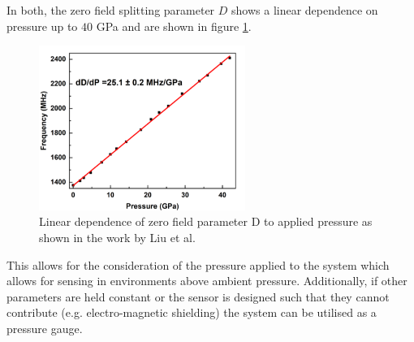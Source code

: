 In both, the zero field splitting parameter $D$ shows
a linear dependence on pressure up to $40$ GPa \cite{doi:10.1021/acs.nanolett.2c03378} and are shown in figure \ref{fig:pressure_d}.

\begin{figure}[H]
	\begin{center}
		\includegraphics[width=0.6\textwidth]{figures/PressureDependence.png}
	\end{center}
	\caption{Linear dependence of zero field parameter D to applied pressure as shown in the work by Liu et al.}\label{fig:pressure_d}
\end{figure}

This allows for the consideration of the pressure applied to the system which allows for sensing in environments above ambient pressure. Additionally, if other parameters are held constant or the sensor is designed such that they cannot contribute (e.g. electro-magnetic shielding) the system can be utilised as a pressure gauge.



